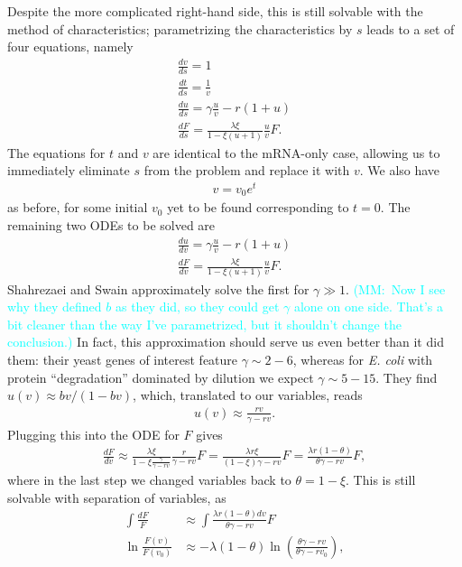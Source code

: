 \documentclass[12pt]{article}%
\newcommand{\mmnote}[1]{\textcolor{cyan}{(MM:~#1)}}
\newcommand{\deriv}[2][{}]{\frac{d #1}{d #2}}
\begin{document}
Despite the more complicated right-hand side, this is still solvable
with the method of characteristics; parametrizing the characteristics by
$s$ leads to a set of four equations, namely
\begin{align}
\deriv[v]{s}=1
\\
\deriv[t]{s}=\frac{1}{v}
\\
\deriv[u]{s} = \gamma \frac{u}{v} - r(1+u)
\\
\deriv[F]{s} = \frac{\lambda\xi}{1-\xi(u+1)} \frac{u}{v} F.
\end{align}
The equations for $t$ and $v$ are identical to the mRNA-only case,
allowing us to immediately eliminate $s$ from the problem and replace it
with $v$. We also have
\begin{align}
v = v_0 e^t
\end{align}
as before, for some initial $v_0$ yet to be found corresponding to $t=0$.
The remaining two ODEs to be solved are
\begin{align}
\deriv[u]{v} = \gamma \frac{u}{v} - r(1+u)
\\
\deriv[F]{v} = \frac{\lambda\xi}{1-\xi(u+1)} \frac{u}{v} F.
\end{align}
Shahrezaei and Swain approximately solve the first for $\gamma \gg 1$.
\mmnote{Now I see why they defined $b$ as they did, so they could get
$\gamma$ alone on one side. That's a bit cleaner than the way I've
parametrized, but it shouldn't change the conclusion.} In fact, this
approximation should serve us even better than it did them: their yeast
genes of interest feature $\gamma\sim 2-6$, whereas for \textit{E. coli}
with protein ``degradation'' dominated by dilution we expect $\gamma\sim
5-15$. They find $u(v) \approx bv/(1-bv)$, which, translated to our
variables, reads
\begin{align}
u(v) \approx \frac{rv}{\gamma-rv}.
\end{align}
Plugging this into the ODE for $F$ gives
\begin{align}
\deriv[F]{v} \approx
        \frac{\lambda\xi}{1-\xi\frac{\gamma}{\gamma-rv}} \frac{r}{\gamma-rv} F
        = \frac{\lambda r \xi}{(1-\xi)\gamma - rv} F
        = \frac{\lambda r (1-\theta)}{\theta\gamma - rv} F,
\end{align}
where in the last step we changed variables back to $\theta=1-\xi$.
This is still solvable with separation of variables, as
\begin{align}
\int\frac{dF}{F} &\approx \int \frac{\lambda r (1-\theta) dv}{\theta\gamma - rv} F
\\
\ln \frac{F(v)}{F(v_0)} &\approx -\lambda (1-\theta)
                \ln\left(\frac{\theta\gamma - rv}{\theta\gamma - rv_0}\right),
\end{align}
\end{document}
